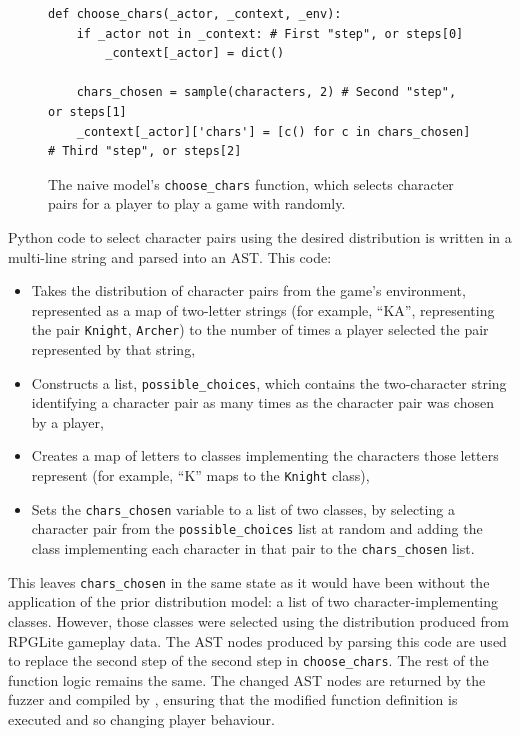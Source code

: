 \begin{figure}[hp]
  \begin{lstlisting}
def choose_chars(_actor, _context, _env):
    if _actor not in _context: # First "step", or steps[0]
        _context[_actor] = dict()

    chars_chosen = sample(characters, 2) # Second "step", or steps[1]
    _context[_actor]['chars'] = [c() for c in chars_chosen] # Third "step", or steps[2]
  \end{lstlisting}
  \caption{The naive model's \lstinline{choose_chars} function, which selects
  character pairs for a player to play a game with randomly.}
  \label{fig:choose_chars_implementation_annotated_with_steps}
\end{figure}

Python code to select character pairs using the desired distribution is written
in a multi-line string and parsed into an AST. This code:

\begin{itemize}
\item Takes the distribution of character pairs from the game's environment,
represented as a map of two-letter strings (for example, ``KA'', representing
the pair \lstinline{Knight}, \lstinline{Archer}) to the number of times a player
selected the pair represented by that string,
\item Constructs a list, \lstinline{possible_choices}, which contains the
two-character string identifying a character pair as many times as the character
pair was chosen by a player,
\item Creates a map of letters to classes implementing the characters those
letters represent (for example, ``K'' maps to the \lstinline{Knight} class),
\item Sets the \lstinline{chars_chosen} variable to a list of two classes, by
selecting a character pair from the \lstinline{possible_choices} list at random
and adding the class implementing each character in that pair to the
\lstinline{chars_chosen} list.
\end{itemize}

This leaves \lstinline{chars_chosen} in the same state as it would have been
without the application of the prior distribution model: a list of two
character-implementing classes. However, those classes were selected using the
distribution produced from RPGLite gameplay data. The AST nodes produced by
parsing this code are used to replace the second step of the second step in
\lstinline{choose_chars}. The rest of the function logic remains the same. The
changed AST nodes are returned by the fuzzer and compiled by \pdsf{}, ensuring
that the modified function definition is executed and so changing player behaviour.



